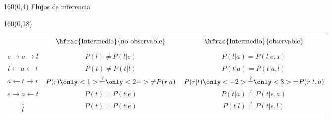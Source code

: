 \documentclass[shownotes,aspectratio=169]{beamer}
\begin{document}
\begin{frame}[plain]
\begin{textblock}{160}(0,4)
\centering \Large Flujos de inferencia
\end{textblock}

\begin{textblock}{160}(0,18)
\centering
 \begin{tabular}{c c|c}
 & $\hfrac{\text{Intermedio}}{\text{no observable}}$ &   $\hfrac{\text{Intermedio}}{\text{observable}}$ \\
 & & \\
 $ e \rightarrow a \rightarrow l $    & $P(l) \neq P(l|e)$ & $P(l|a) \overset{\phantom{?}}{=} P(l|e,a)$ \\ 
 $ l \leftarrow a \leftarrow t $      &  $P(t) \neq P(t|l)$  & $P(t|a) \overset{\phantom{?}}{=} P(t|a,l)$ \\ 
 $ a \leftarrow t \rightarrow r $     & $P(r) \only<1>{\overset{?}{=}}\only<2->{\neq} P(r|a)$ & $P(r|t) \only<-2>{\overset{?}{=}}\only<3>{\overset{\phantom{?}}{=}} P(r|t,a)$ \\
 $ e \rightarrow a \leftarrow t $     & $P(t) = P(t|e)$ & $P(t|a) \overset{?}{=} P(t|e,a)$ \\
            $\overset{\downarrow}{l}$  & $P(t) = P(t|e)$ & $P(t|l) \overset{?}{=} P(t|e,l)$
 \end{tabular} 
 \end{textblock}
 
\end{frame}
\end{document}
